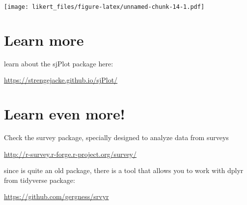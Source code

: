 \documentclass[
]{article}
\begin{document}
\texttt{[image: likert\_files/figure-latex/unnamed-chunk-14-1.pdf]}

\hypertarget{learn-more}{%
\section{Learn more}\label{learn-more}}

learn about the sjPlot package here:

\url{https://strengejacke.github.io/sjPlot/}

\hypertarget{learn-even-more}{%
\section{Learn even more!}\label{learn-even-more}}

Check the survey package, specially designed to analyze data from
surveys

\url{http://r-survey.r-forge.r-project.org/survey/}

since is quite an old package, there is a tool that allows you to work
with dplyr from tidyverse package:

\url{https://github.com/gergness/srvyr}
\end{document}
